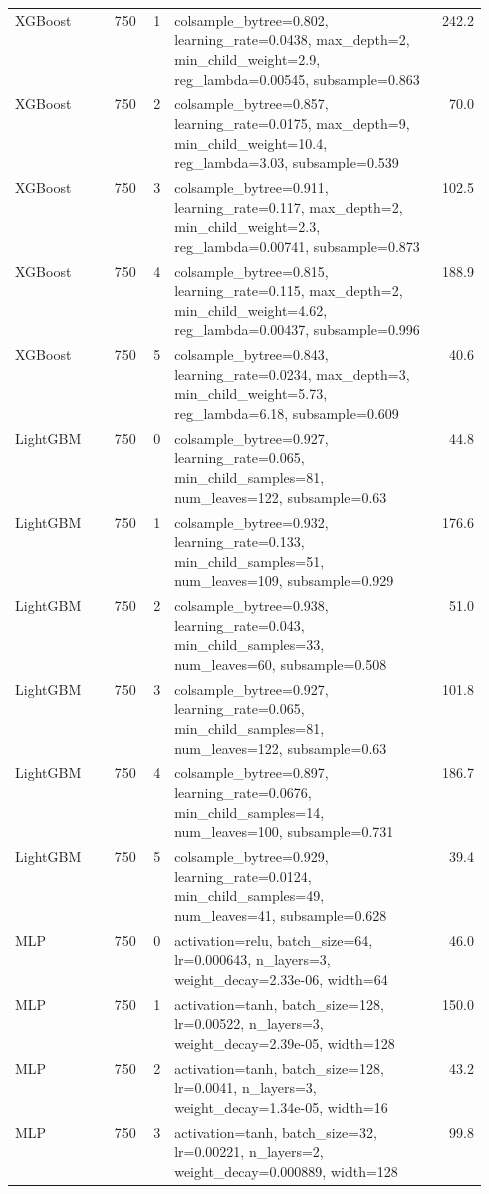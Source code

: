\begin{longtable}{lrrp{0.55\linewidth}r}
XGBoost & 750 & 1 & colsample\_bytree=0.802, learning\_rate=0.0438, max\_depth=2, min\_child\_weight=2.9, reg\_lambda=0.00545, subsample=0.863 & 242.2 \\
XGBoost & 750 & 2 & colsample\_bytree=0.857, learning\_rate=0.0175, max\_depth=9, min\_child\_weight=10.4, reg\_lambda=3.03, subsample=0.539 & 70.0 \\
XGBoost & 750 & 3 & colsample\_bytree=0.911, learning\_rate=0.117, max\_depth=2, min\_child\_weight=2.3, reg\_lambda=0.00741, subsample=0.873 & 102.5 \\
XGBoost & 750 & 4 & colsample\_bytree=0.815, learning\_rate=0.115, max\_depth=2, min\_child\_weight=4.62, reg\_lambda=0.00437, subsample=0.996 & 188.9 \\
XGBoost & 750 & 5 & colsample\_bytree=0.843, learning\_rate=0.0234, max\_depth=3, min\_child\_weight=5.73, reg\_lambda=6.18, subsample=0.609 & 40.6 \\
LightGBM & 750 & 0 & colsample\_bytree=0.927, learning\_rate=0.065, min\_child\_samples=81, num\_leaves=122, subsample=0.63 & 44.8 \\
LightGBM & 750 & 1 & colsample\_bytree=0.932, learning\_rate=0.133, min\_child\_samples=51, num\_leaves=109, subsample=0.929 & 176.6 \\
LightGBM & 750 & 2 & colsample\_bytree=0.938, learning\_rate=0.043, min\_child\_samples=33, num\_leaves=60, subsample=0.508 & 51.0 \\
LightGBM & 750 & 3 & colsample\_bytree=0.927, learning\_rate=0.065, min\_child\_samples=81, num\_leaves=122, subsample=0.63 & 101.8 \\
LightGBM & 750 & 4 & colsample\_bytree=0.897, learning\_rate=0.0676, min\_child\_samples=14, num\_leaves=100, subsample=0.731 & 186.7 \\
LightGBM & 750 & 5 & colsample\_bytree=0.929, learning\_rate=0.0124, min\_child\_samples=49, num\_leaves=41, subsample=0.628 & 39.4 \\
MLP & 750 & 0 & activation=relu, batch\_size=64, lr=0.000643, n\_layers=3, weight\_decay=2.33e-06, width=64 & 46.0 \\
MLP & 750 & 1 & activation=tanh, batch\_size=128, lr=0.00522, n\_layers=3, weight\_decay=2.39e-05, width=128 & 150.0 \\
MLP & 750 & 2 & activation=tanh, batch\_size=128, lr=0.0041, n\_layers=3, weight\_decay=1.34e-05, width=16 & 43.2 \\
MLP & 750 & 3 & activation=tanh, batch\_size=32, lr=0.00221, n\_layers=2, weight\_decay=0.000889, width=128 & 99.8 \\

\end{longtable}

